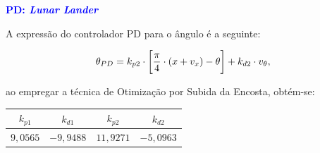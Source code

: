 \documentclass[aspectratio=169]{beamer}
\begin{document}
\begin{frame}{\textcolor{blue}{\textbf{PD: \textit{Lunar Lander}}}}
\vspace{-1.5cm}

\justifying A expressão do controlador PD para o ângulo é a seguinte:

\begin{equation}
    \theta_{PD} = k_{p2}\cdot \bigg{[} \frac{\pi}{4}\cdot (x+v_x)-\theta\bigg{]}+k_{d2}\cdot v_{\theta},
    \label{eq:tpd}
\end{equation}

\noindent \justifying ao empregar a técnica de Otimização por Subida da Encosta, obtém-se:


\begin{table}[H]
	\centering
	\vspace*{.05cm}
	\begin{tabular}{cccc}
            \rowcolor{blue!30} $k_{p1}$ & $k_{d1}$ & $k_{p2}$ & $k_{d2}$ \\
            \hline
            $9,0565$ & $-9,9488$ & $11,9271$ & $-5,0963$\\ 
            \hline
	\end{tabular}  
    \label{tab:intcartpole}                 %
\end{table}

\end{frame}

\end{document}

